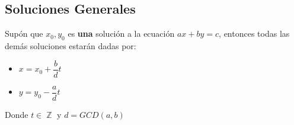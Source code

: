 \documentclass[12pt, fleqn]{report}                             %
\DeclareMathOperator \Integers  {\mathbb{Z}}                     %
\begin{document}
        \clearpage
        \subsection{Soluciones Generales}

            Supón que $x_0, y_0$ es \textbf{una} solución a la ecuación $ax+ by = c$,
            entonces todas las demás soluciones estarán dadas por:

            \begin{itemize}
                \item $x = x_0 + \dfrac{b}{d}t$
                \item $y = y_0 - \dfrac{a}{d}t$
            \end{itemize}

            Donde $t \in \Integers$ y $d=GCD(a,b)$
\end{document}
